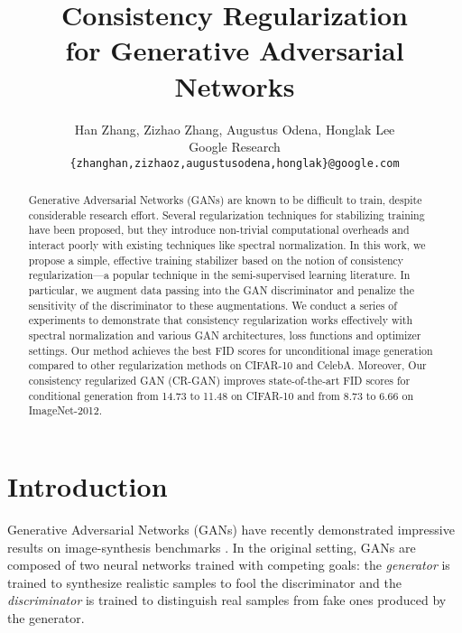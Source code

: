 \documentclass{article} \usepackage{iclr2020_conference,times}
\title{Consistency Regularization \\ for Generative Adversarial Networks}
\author{Han Zhang, Zizhao Zhang, Augustus Odena, Honglak Lee \\
Google Research\\
\texttt{\{zhanghan,zizhaoz,augustusodena,honglak\}@google.com} 
}
\begin{document}
\maketitle

\begin{abstract}
Generative Adversarial Networks (GANs) are known to be difficult to train, despite considerable research effort.
Several regularization techniques for stabilizing training have been proposed, but they introduce non-trivial computational overheads and interact poorly with existing techniques like spectral normalization.
In this work, we propose a simple, effective training stabilizer based on the notion of consistency regularization---a popular technique in the semi-supervised learning literature.
In particular, we augment data passing into the GAN discriminator and penalize the sensitivity of the discriminator to these augmentations. 
We conduct a series of experiments to demonstrate that consistency regularization works effectively with spectral normalization and various GAN architectures, loss functions and optimizer settings. Our method achieves the best FID scores for unconditional image generation compared to other regularization methods on CIFAR-10 and CelebA.  
Moreover, Our consistency regularized GAN (CR-GAN) improves state-of-the-art FID scores for conditional generation from 14.73 to 11.48 on  CIFAR-10 and from 8.73 to 6.66 on ImageNet-2012. 

\end{abstract}

\section{Introduction}

Generative Adversarial Networks (GANs) \citep{goodfellow2014generative} have recently demonstrated impressive results on image-synthesis benchmarks \citep{Radford15, Han17,  Miyato18b, zhang2018photographic, BIGGAN, Karras2019}. In the original setting, GANs are composed of two neural networks trained with competing goals: the \emph{generator} is trained to synthesize realistic samples to fool the discriminator and the \emph{discriminator} is trained to distinguish real samples from fake ones produced by the generator. 
\end{document}
